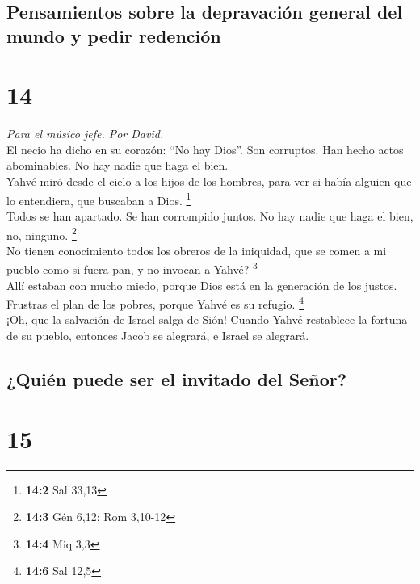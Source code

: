 \hypertarget{pensamientos-sobre-la-depravaciuxf3n-general-del-mundo-y-pedir-redenciuxf3n}{%
\subsection{Pensamientos sobre la depravación general del mundo y pedir
redención}\label{pensamientos-sobre-la-depravaciuxf3n-general-del-mundo-y-pedir-redenciuxf3n}}

\hypertarget{section-13}{%
\section{14}\label{section-13}}

\emph{Para el músico jefe. Por David.}\\
 El necio ha dicho en su corazón: ``No hay Dios''. Son
corruptos. Han hecho actos abominables. No hay nadie que haga el bien.\\
 Yahvé miró desde el cielo a los hijos de los hombres,
para ver si había alguien que lo entendiera, que buscaban a Dios.
\footnote{\textbf{14:2} Sal 33,13}\\
 Todos se han apartado. Se han corrompido juntos. No hay
nadie que haga el bien, no, ninguno. \footnote{\textbf{14:3} Gén 6,12;
  Rom 3,10-12}\\
 No tienen conocimiento todos los obreros de la iniquidad,
que se comen a mi pueblo como si fuera pan, y no invocan a Yahvé?
\footnote{\textbf{14:4} Miq 3,3}\\
 Allí estaban con mucho miedo, porque Dios está en la
generación de los justos.\\
 Frustras el plan de los pobres, porque Yahvé es su
refugio. \footnote{\textbf{14:6} Sal 12,5}\\
 ¡Oh, que la salvación de Israel salga de Sión! Cuando
Yahvé restablece la fortuna de su pueblo, entonces Jacob se alegrará, e
Israel se alegrará.

\hypertarget{quiuxe9n-puede-ser-el-invitado-del-seuxf1or}{%
\subsection{¿Quién puede ser el invitado del
Señor?}\label{quiuxe9n-puede-ser-el-invitado-del-seuxf1or}}

\hypertarget{section-14}{%
\section{15}\label{section-14}}


